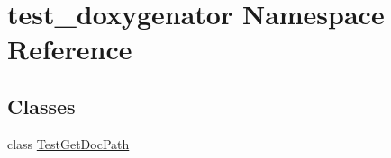 \hypertarget{namespacetest__doxygenator}{}\section{test\+\_\+doxygenator Namespace Reference}
\label{namespacetest__doxygenator}
\subsection*{Classes}
\begin{DoxyCompactItemize}
\item 
class \hyperlink{classtest__doxygenator_1_1TestGetDocPath}{Test\+Get\+Doc\+Path}
\end{DoxyCompactItemize}
